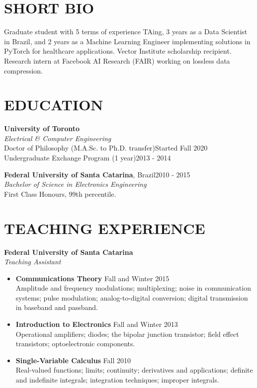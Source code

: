 \documentclass[margin, line]{res}
\begin{document}
\address{\textbf{For more information}: \url{https://dsevero.com}}
\begin{resume}
\section{SHORT BIO}
Graduate student with 5 terms of experience TAing, 3 years as a Data Scientist in Brazil, and 2 years as a Machine Learning Engineer implementing solutions in PyTorch for healthcare applications. Vector Institute scholarship recipient. Research intern at Facebook AI Research (FAIR) working on lossless data compression.

\section{EDUCATION}
\textbf{University of Toronto}\\
{\sl Electrical \& Computer Engineering}\\
Doctor of Philosophy (M.A.Sc. to Ph.D. transfer)\hfill Started Fall 2020\\
Undergraduate Exchange Program (1 year)\hfill 2013 - 2014

\textbf{Federal University of Santa Catarina}, Brazil\hfill 2010 - 2015 \\
{\sl Bachelor of Science in Electronics Engineering}\\
First Class Honours, 99th percentile.

\section{TEACHING EXPERIENCE}
\textbf{Federal University of Santa Catarina}\\
{\sl Teaching Assistant}\\
\begin{itemize}
    \item \textbf{Communications Theory} \hfill Fall and Winter 2015\\
Amplitude and frequency modulations; multiplexing; noise in communication systems; pulse modulation; analog-to-digital conversion; digital transmission in baseband and passband.
    \item \textbf{Introduction to Electronics} \hfill Fall and Winter 2013\\
Operational amplifiers; diodes; the bipolar junction transistor; field effect transistors; optoelectronic components.
    \item \textbf{Single-Variable Calculus} \hfill Fall 2010\\
Real-valued functions; limits; continuity; derivatives and applications; definite and indefinite integrals; integration techniques; improper integrals.
\end{itemize}


\end{resume}
\end{document}
